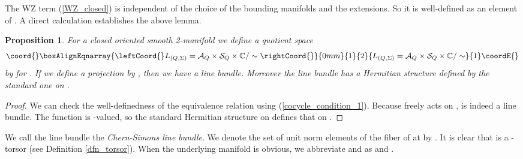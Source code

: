\documentclass[a4paper,a4paper]{article}
\newtheorem{prop}[thm]{Proposition}
\theoremstyle{definition}
\theoremstyle{remark}
\providecommand{\C}{\mathbb{C}}
\providecommand{\T}{\mathbb{T}}
\providecommand{\A}{\mathcal{A}}
\providecommand{\G}{\mathcal{G}}
\renewcommand{\S}{\mathcal{S}}
\begin{document}
The WZ term (\ref{WZ_closed}) is independent of the choice of the bounding manifolds and the extensions. So it is well-defined as an element of \myHighlight{$\T$}\coordHE{}. A direct calculation establishes the above lemma.

\begin{prop} \label{thm_cslinebundle}
For a closed oriented smooth 2-manifold \myHighlight{$\Sigma$}\coordHE{} we define a quotient space 
\begin{eqnarray}\coord{}\boxAlignEqnarray{\leftCoord{}
L_{(Q,\Sigma)} = \A_Q \times \S_Q \times \C / \sim 
\rightCoord{}}{0mm}{1}{2}{
L_{(Q,\Sigma)} = \A_Q \times \S_Q \times \C / \sim 
}{1}\coordE{}\end{eqnarray}
by \coordHE{} for \myHighlight{$g \in \G_\Sigma$}\coordHE{}. If we define a projection \myHighlight{$\Pi : L_{(Q,\Sigma)} \to \A_Q$}\coordHE{} by \coordHE{}, then we have a line bundle. Moreover the line bundle has a Hermitian structure defined by the standard one on \myHighlight{$\C$}\coordHE{}.
\end{prop}

\begin{proof}
We can check the well-definedness of the equivalence relation using (\ref{cocycle_condition_1}). Because \myHighlight{$\G_\Sigma$}\coordHE{} freely acts on \myHighlight{$\S_Q$}\coordHE{}, \coordHE{} is indeed a line bundle. The function \coordHE{} is \myHighlight{$\T$}\coordHE{}-valued, so the standard Hermitian structure on \myHighlight{$\C$}\coordHE{} defines that on \coordHE{}.
\end{proof}

We call the line bundle the \textit{Chern-Simons line bundle}. We denote the set of unit norm elements of the fiber of \coordHE{} at \coordHE{} by \coordHE{}. It is clear that \coordHE{} is a \myHighlight{$\T$}\coordHE{}-torsor (see Definition \ref{dfn_torsor}). When the underlying manifold \myHighlight{$\Sigma$}\coordHE{} is obvious, we abbreviate \coordHE{} and \coordHE{} as \coordHE{} and \coordHE{}.
\end{document}
